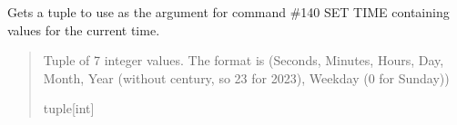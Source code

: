 \documentclass[letterpaper,10pt,english]{sphinxmanual}
\begin{document}
\begin{fulllineitems}
\begin{fulllineitems}
\end{fulllineitems}


\begin{fulllineitems}
\label{\detokenize{PodApi.Devices:PodApi.Devices.PodDevice_8229.Pod8229.GetCurrentTime}}
\pysigstartsignatures
{}
\pysigstopsignatures
\sphinxAtStartPar
Gets a tuple to use as the argument for command \#140 SET TIME containing values for the current time.
\begin{quote}\begin{description}
\sphinxAtStartPar
Tuple of 7 integer values. The format is (Seconds, Minutes, Hours, Day, Month, Year                 (without century, so 23 for 2023), Weekday (0 for Sunday))

\sphinxAtStartPar
tuple{[}int{]}

\end{description}\end{quote}

\end{fulllineitems}



\end{fulllineitems}
\end{document}
